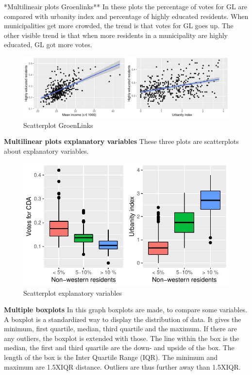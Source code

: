 \documentclass[11pt,]{article}
\begin{document}
*Multilineair plots Groenlinks** In these plots the percentage of votes
for GL are compared with urbanity index and percentage of highly
educated residents. When municipalities get more crowded, the trend is
that votes for GL goes up. The other visible trend is that when more
residents in a municipality are highly educated, GL got more votes.\\

\begin{figure}

{\centering \includegraphics{Report_files/figure-latex/unnamed-chunk-6-1} 

}

\caption{Scatterplot GroenLinks}\label{fig:unnamed-chunk-6}
\end{figure}

\textbf{Multilinear plots explanatory variables} These three plots are
scatterplots about explanatory variables.

\begin{figure}

{\centering \includegraphics{Report_files/figure-latex/unnamed-chunk-7-1} 

}

\caption{Scatterplot explanatory variables}\label{fig:unnamed-chunk-7}
\end{figure}

\textbf{Multiple boxplots} In this graph boxplots are made, to compare
some variables. A boxplot is a standardized way to display the
distribution of data. It gives the minimum, first quartile, median,
third quartile and the maximum. If there are any outliers, the boxplot
is extended with those. The line within the box is the median, the first
and third quartile are the down- and upside of the box. The length of
the box is the Inter Quartile Range (IQR). The minimum and maximum are
1.5XIQR distance. Outliers are thus further away than 1.5XIQR.
\end{document}
